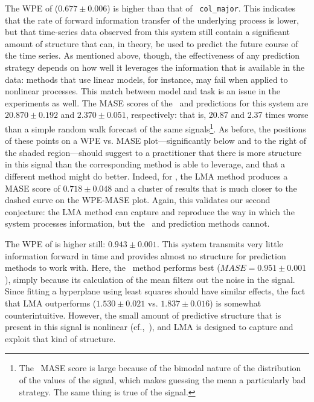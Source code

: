 The WPE of \svdfive ($0.677 \pm 0.006$) is higher than that of {\tt
  col\_major}.  This indicates that the rate of forward information
transfer of the underlying process is lower, but that time-series data
observed from this system still contain a significant amount of
structure that can, in theory, be used to predict the future course of
the time series.  As mentioned above, though, the effectiveness of any
prediction strategy depends on how well it leverages the information
that is available in the data: methods that use linear models, for
instance, may fail when applied to nonlinear processes.
%
%
This match between model and task is an issue in the \svdfive
experiments as well.  The MASE scores of the \naive ~and \arima
predictions for this system are $20.870 \pm 0.192$ and $2.370 \pm
0.051$, respectively: that is, 20.87 and 2.37 times worse than a
simple random walk forecast of the same signals\footnote{The \naive
  ~MASE score is large because of the bimodal nature of the
  distribution of the values of the signal, which makes guessing the
  mean a particularly bad strategy.  The same thing is true of the
  \svdthree signal.}.  As before, the positions of these points on a
WPE vs. MASE plot---significantly below and to the right of the shaded
region---should suggest to a practitioner that there is more structure
in this signal than the corresponding method is able to leverage, and
that a different method might do better.  Indeed, for \svdfive, the
LMA method produces a MASE score of $ 0.718\pm 0.048 $ and a cluster
of results that is much closer to the dashed curve on the WPE-MASE
plot.  Again, this validates our second conjecture: the LMA method can
capture and reproduce the way in which the \svdfive system processes
information, but the \naive ~and \arima prediction methods cannot.

The WPE of \gcc is higher still: $0.943 \pm 0.001$.  This system
transmits very little information forward in time and provides almost
no structure for prediction methods to work with.  Here, the \naive
~method performs best ($MASE=0.951 \pm 0.001$), simply because its
calculation of the mean filters out the noise in the signal.  Since
fitting a hyperplane using least squares should have similar effects,
the fact that LMA outperforms \arima ($1.530 \pm 0.021$ vs. $1.837
\pm 0.016$) is somewhat counterintuitive.  However, the small amount
of predictive structure that is present in this signal is nonlinear
(cf.,~\cite{mytkowicz09}), and LMA is designed to capture and exploit
that kind of structure.


